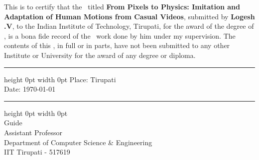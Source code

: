 \certificate

\vspace*{0.5in}

This is to certify that the \thesis~titled {\bf From Pixels to Physics: Imitation and Adaptation of Human Motions from Casual Videos}, submitted by {\bf Logesh .V}, 
  to the Indian Institute of Technology, Tirupati, for
the award of the degree of \degree, is a bona fide
record of the \research~work done by him under my supervision.  The
contents of this \thesis, in full or in parts, have not been submitted
to any other Institute or University for the award of any degree or
diploma.


\vspace*{1.5in}

\begin{singlespacing}
	\parbox[t]{4cm}{\hrule height 0pt width 0pt
	\noindent Place: Tirupati\\
	\noindent Date: \today \\	
}
\hfill
	\parbox[t]{5cm}{\hrule height 0pt width 0pt
		 \\
		\noindent Guide \\ 
		\noindent Assistant Professor \\
		\noindent Department of Computer Science \& Engineering\\
		\noindent IIT Tirupati - 517619 \\
	}

\end{singlespacing}

